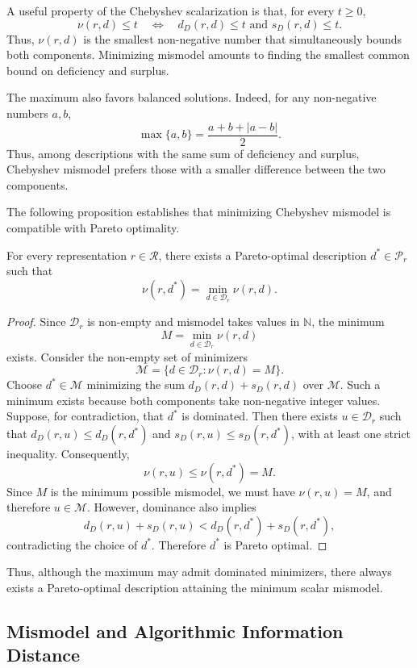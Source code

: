 A useful property of the Chebyshev scalarization is that, for every $t\ge 0$,
\[
\nu(r,d)\le t \quad\Longleftrightarrow\quad d_D(r,d)\le t \text{ and } s_D(r,d)\le t.
\]
Thus, $\nu(r,d)$ is the smallest non-negative number that simultaneously bounds both components. Minimizing mismodel amounts to finding the smallest common bound on deficiency and surplus.

The maximum also favors balanced solutions. Indeed, for any non-negative numbers $a,b$,
\[
\max\{a,b\} = \frac{a+b+|a-b|}{2}.
\]
Thus, among descriptions with the same sum of deficiency and surplus, Chebyshev mismodel prefers those with a smaller difference between the two components.

The following proposition establishes that minimizing Chebyshev mismodel is compatible with Pareto optimality.

\begin{proposition}
\label{prop:chebyshev_attains_min_on_pareto}
For every representation $r\in\mathcal R$, there exists a Pareto-optimal description $d^\ast\in\mathcal P_r$
such that
\[
\nu(r,d^\ast) = \min_{d\in\mathcal D_r}\nu(r,d).
\]
\end{proposition}
\begin{proof}
Since $\mathcal D_r$ is non-empty and mismodel takes values in $\mathbb N$, the minimum
\[
M=\min_{d\in\mathcal D_r}\nu(r,d)
\]
exists. Consider the non-empty set of minimizers
\[
\mathcal M = \{d\in\mathcal D_r:\nu(r,d)=M\}.
\]
Choose $d^\ast\in\mathcal M$ minimizing the sum $d_D(r,d) + s_D(r,d)$ over $\mathcal M$. Such a minimum exists because both components take non-negative integer values. Suppose, for contradiction, that $d^\ast$ is dominated. Then there exists $u\in\mathcal D_r$ such that $d_D(r,u)\le d_D(r,d^\ast)$ and $s_D(r,u)\le s_D(r,d^\ast)$, with at least one strict inequality. Consequently,
\[
\nu(r,u)\le\nu(r,d^\ast)=M.
\]
Since $M$ is the minimum possible mismodel, we must have $\nu(r,u)=M$, and therefore
$u\in\mathcal M$. However, dominance also implies
\[
d_D(r,u)+s_D(r,u) < d_D(r,d^\ast)+s_D(r,d^\ast),
\]
contradicting the choice of $d^\ast$. Therefore $d^\ast$ is Pareto optimal.
\end{proof}

Thus, although the maximum may admit dominated minimizers, there always exists a Pareto-optimal description attaining the minimum scalar mismodel.


\subsection*{Mismodel and Algorithmic Information Distance}

